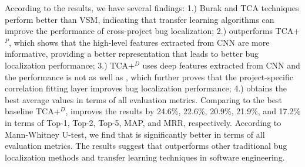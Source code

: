 According to the results, we have several findings: 1.) Burak and TCA techniques perform better than VSM, indicating that transfer learning algorithms can improve the performance of cross-project bug localization; 2.) \TRANPCNN outperforms TCA+$^P$, which shows that the high-level features extracted from CNN are more informative, providing a better representation that leads to better bug localization performance; 3.) TCA+$^D$ uses deep features extracted from CNN and the performance is not as well as \TRANPCNN, which further proves that the project-specific correlation fitting layer improves bug localization performance; 4.) \TRANPCNN obtains the best average values in terms of all evaluation metrics. Comparing to the best baseline TCA+$^{D}$, \TRANPCNN improves the results by 24.6\%, 22.6\%, 20.9\%, 21.9\%, and 17.2\% in terms of Top-1, Top-2, Top-5, MAP, and MRR, respectively. According to Mann-Whitney U-test, we find that \TRANPCNN is significantly better in terms of all evaluation metrics. The results suggest that \TRANPCNN outperforms other traditional bug localization methods and transfer learning techniques in software engineering.


